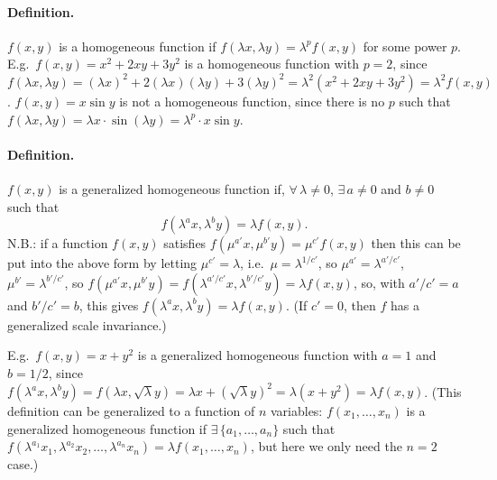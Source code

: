 \paragraph{Definition.} $f(x,y)$ is a homogeneous function if $f(\lambda x,\lambda y) = \lambda^pf(x,y)$
for some power $p$. E.g.\ $f(x,y) = x^2+2xy+3y^2$ is a homogeneous function with $p = 2$, since
$f(\lambda x,\lambda y) = (\lambda x)^2+2(\lambda x)(\lambda y)+3(\lambda y)^2 = \lambda^2(x^2+2xy+3y^2) = \lambda^2f(x,y)$.
$f(x,y) = x\sin y$ is not a homogeneous function, since there is no $p$ such that
$f(\lambda x,\lambda y) = \lambda x\cdot\sin(\lambda y) = \lambda^p\cdot x\sin y$.

\paragraph{Definition.} $f(x,y)$ is a generalized homogeneous function if, $\forall\,\lambda\ne 0$,
$\exists\,a\ne 0$ and $b\ne 0$ such that
\begin{equation}
  f(\lambda^ax,\lambda^by) = \lambda f(x,y).
\end{equation}
N.B.: if a function $f(x,y)$ satisfies $f(\mu^{a'}x,\mu^{b'}y) = \mu^{c'}f(x,y)$ then this can be put
into the above form by letting $\mu^{c'} = \lambda$, i.e.\ $\mu = \lambda^{1/c'}$, so
$\mu^{a'} = \lambda^{a'/c'}$, $\mu^{b'} = \lambda^{b'/c'}$, so
$f(\mu^{a'}x,\mu^{b'}y) = f(\lambda^{a'/c'}x,\lambda^{b'/c'}y) = \lambda f(x,y)$, so, with $a'/c' = a$
and $b'/c' = b$, this gives $f(\lambda^ax,\lambda^by) = \lambda f(x,y)$. (If $c' = 0$, then $f$ has a
generalized scale invariance.)

E.g.\ $f(x,y) = x+y^2$ is a generalized homogeneous function with $a = 1$ and $b = 1/2$, since
$f(\lambda^ax,\lambda^by) = f(\lambda x,\sqrt\lambda y) = \lambda x + (\sqrt\lambda y)^2 = \lambda(x+y^2) = \lambda f(x,y)$.
(This definition can be generalized to a function of $n$ variables: $f(x_1,\ldots,x_n)$ is a generalized
homogeneous function if $\exists\,\{a_1,\ldots,a_n\}$ such that
$f(\lambda^{a_1}x_1,\lambda^{a_2}x_2,\ldots,\lambda^{a_n}x_n) = \lambda f(x_1,\ldots,x_n)$, but here we only
need the $n = 2$ case.)

